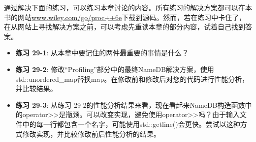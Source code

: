 通过解决下面的练习，可以练习本章讨论的内容。所有练习的解决方案都可以在本书的网站\url{www.wiley.com/go/proc++6e}下载到源码。然而，若在练习中卡住了，在从网站上寻找解决方案之前，可以考虑先重读本章的部分内容，试着自己找到答案。

\begin{itemize}
\item
\textbf{练习 29-1}: 从本章中要记住的两件最重要的事情是什么？

\item
\textbf{练习 29-2}: 修改“Profiling”部分中的最终NameDB解决方案，使用std::unordered\_map替换map。在修改前和修改后对您的代码进行性能分析，并比较结果。

\item
\textbf{练习 29-3}: 从练习 29-2的性能分析结果来看，现在看起来NameDB构造函数中的operator>{}>是瓶颈。可以改变实现，避免使用operator>{}>吗？由于输入文件中的每一行都包含一个名字，可能使用std::getline()会更快。尝试以这种方式修改实现，并比较修改前后性能分析的结果。
\end{itemize}






